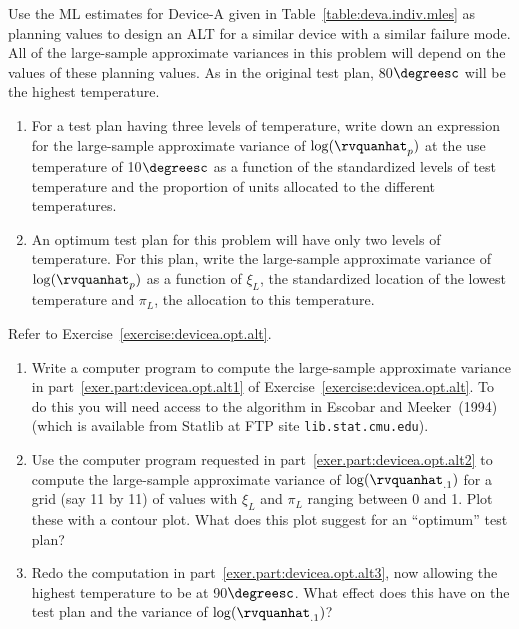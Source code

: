 \begin{exercise1}
\label{exercise:devicea.opt.alt}
Use the ML estimates for Device-A given in
Table~\ref{table:deva.indiv.mles} as planning values to design an
ALT for a similar device with a similar failure
mode. All of the large-sample approximate variances in this problem
will depend on the values of these planning values.  As in the
original test plan, 80$\degreesc$ will be the highest temperature.
\begin{enumerate}
\item
\label{exer.part:devicea.opt.alt1}
For a test plan having three levels of temperature, write down an
expression for the large-sample approximate variance of $\log(\rvquanhat_{p})$
at the use temperature of 10$\degreesc$ as a function of the
standardized levels of test temperature and the proportion of units
allocated to the different temperatures.
\item
An optimum test plan for this problem will have only
two levels of temperature. For this plan, write the
large-sample approximate variance of $\log(\rvquanhat_{p})$ as a function
of $\xi_{L}$, the standardized location of the lowest temperature and
 $\pi_{L}$, the allocation to this temperature.
\end{enumerate}
\end{exercise1}

\begin{exercise2}
Refer to Exercise~\ref{exercise:devicea.opt.alt}.
\begin{enumerate}
\item
\label{exer.part:devicea.opt.alt2}
Write a computer program to compute the large-sample approximate variance
in part~\ref{exer.part:devicea.opt.alt1} 
of Exercise~\ref{exercise:devicea.opt.alt}. To do this you will
need access to the algorithm in Escobar and Meeker~(1994)
(which is available from Statlib at FTP site {\tt lib.stat.cmu.edu}).
\item
\label{exer.part:devicea.opt.alt3}
Use the computer program requested in part~\ref{exer.part:devicea.opt.alt2} to
compute the large-sample approximate variance of $\log(\rvquanhat_{.1})$ for
a grid (say 11 by 11) of values with $\xi_{L}$ and $\pi_{L}$ ranging between
0 and 1.  Plot these with a contour plot. What does this plot suggest
for an ``optimum'' test plan?
\item
Redo the computation in part~\ref{exer.part:devicea.opt.alt3}, now
allowing the highest temperature to be at 90$\degreesc$. What effect
does this have on the test plan and the variance of $\log(\rvquanhat_{.1})$?
\end{enumerate}
\end{exercise2}


